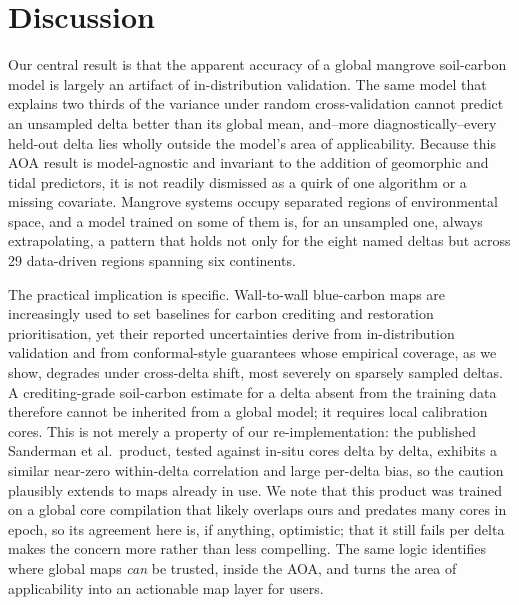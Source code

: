 \documentclass[11pt]{article}
\begin{document}
\section{Discussion}
Our central result is that the apparent accuracy of a global mangrove soil-carbon model
is largely an artifact of in-distribution validation. The same model that explains two
thirds of the variance under random cross-validation cannot predict an unsampled delta
better than its global mean, and--more diagnostically--every held-out delta lies wholly
outside the model's area of applicability. Because this AOA result is model-agnostic and
invariant to the addition of geomorphic and tidal predictors, it is not readily
dismissed as a quirk of one algorithm or a missing covariate. Mangrove systems
occupy separated regions of environmental space, and a model trained on some of them is,
for an unsampled one, always extrapolating, a pattern that holds not only for the eight
named deltas but across 29 data-driven regions spanning six continents.

The practical implication is specific. Wall-to-wall blue-carbon maps are increasingly
used to set baselines for carbon crediting and restoration prioritisation, yet their
reported uncertainties derive from in-distribution validation and from conformal-style
guarantees whose empirical coverage, as we show, degrades under cross-delta shift, most
severely on sparsely sampled deltas. A crediting-grade soil-carbon estimate for a delta
absent from the training data
therefore cannot be inherited from a global model; it requires local calibration cores.
This is not merely a property of our re-implementation: the published Sanderman et al.\
product, tested against in-situ cores delta by delta, exhibits a similar near-zero
within-delta correlation and large per-delta bias, so the caution plausibly extends to
maps already in use. We note that this product was trained on a global core compilation
that likely overlaps ours and predates many cores in epoch, so its agreement here is, if
anything, optimistic; that it still fails per delta makes the concern more rather than
less compelling.
The same logic identifies where global maps \emph{can} be trusted, inside the AOA, and turns the area of applicability into an actionable map layer for users.
\end{document}

